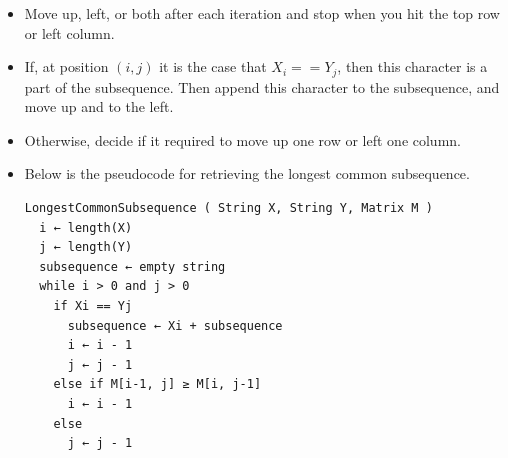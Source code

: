 \documentclass{article}
\begin{document}
\begin{itemize}
\begin{itemize}
        \item Move up, left, or both after each iteration and stop when you hit the top row or left column.
        \item If, at position \((i,j)\) it is the case that \(X_i==Y_j\), then this character is a part of the subsequence. Then append this character to the subsequence, and move up and to the left.
        \item Otherwise, decide if it required to move up one row or left one column.
        \item Below is the pseudocode for retrieving the longest common subsequence.
\begin{verbatim}
LongestCommonSubsequence ( String X, String Y, Matrix M )
  i ← length(X)
  j ← length(Y)
  subsequence ← empty string
  while i > 0 and j > 0
    if Xi == Yj
      subsequence ← Xi + subsequence
      i ← i - 1
      j ← j - 1
    else if M[i-1, j] ≥ M[i, j-1]
      i ← i - 1
    else
      j ← j - 1
\end{verbatim}
        \end{itemize}
    \end{itemize}
\end{document}
